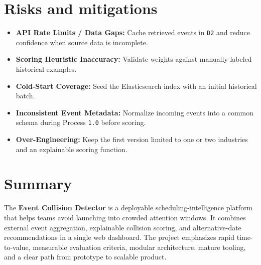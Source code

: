 \documentclass[12pt]{article}
\begin{document}
\section{Risks and mitigations}
\begin{itemize}[leftmargin=0.7cm]
\item \textbf{API Rate Limits / Data Gaps:} Cache retrieved events in \texttt{D2} and reduce confidence when source data is incomplete.
\item \textbf{Scoring Heuristic Inaccuracy:} Validate weights against manually labeled historical examples.
\item \textbf{Cold-Start Coverage:} Seed the Elasticsearch index with an initial historical batch.
\item \textbf{Inconsistent Event Metadata:} Normalize incoming events into a common schema during Process \texttt{1.0} before scoring.
\item \textbf{Over-Engineering:} Keep the first version limited to one or two industries and an explainable scoring function.
\end{itemize}

\section{Summary}
The \textbf{Event Collision Detector} is a deployable scheduling-intelligence platform that helps teams avoid launching into crowded attention windows. It combines external event aggregation, explainable collision scoring, and alternative-date recommendations in a single web dashboard. The project emphasizes rapid time-to-value, measurable evaluation criteria, modular architecture, mature tooling, and a clear path from prototype to scalable product.
\end{document}
